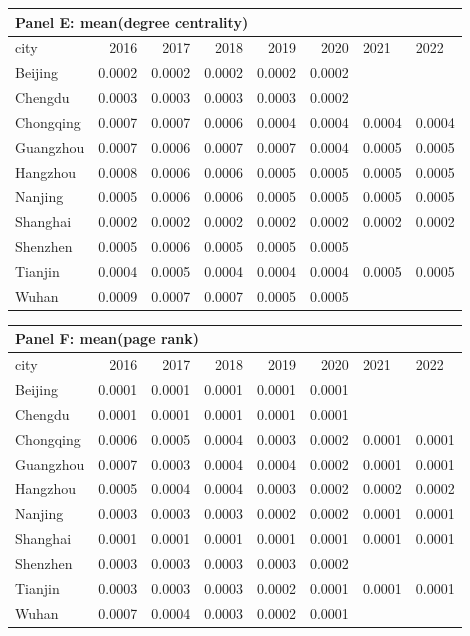 \begin{tabular}{lrrrrrll}
    \multicolumn{8}{l}{\textbf{Panel E: mean(degree centrality)}}\\
\hline
 city      &   2016 &   2017 &   2018 &   2019 &   2020 & 2021   & 2022   \\
\hline
 Beijing   & 0.0002 & 0.0002 & 0.0002 & 0.0002 & 0.0002 &        &        \\
 Chengdu   & 0.0003 & 0.0003 & 0.0003 & 0.0003 & 0.0002 &        &        \\
 Chongqing & 0.0007 & 0.0007 & 0.0006 & 0.0004 & 0.0004 & 0.0004 & 0.0004 \\
 Guangzhou & 0.0007 & 0.0006 & 0.0007 & 0.0007 & 0.0004 & 0.0005 & 0.0005 \\
 Hangzhou  & 0.0008 & 0.0006 & 0.0006 & 0.0005 & 0.0005 & 0.0005 & 0.0005 \\
 Nanjing   & 0.0005 & 0.0006 & 0.0006 & 0.0005 & 0.0005 & 0.0005 & 0.0005 \\
 Shanghai  & 0.0002 & 0.0002 & 0.0002 & 0.0002 & 0.0002 & 0.0002 & 0.0002 \\
 Shenzhen  & 0.0005 & 0.0006 & 0.0005 & 0.0005 & 0.0005 &        &        \\
 Tianjin   & 0.0004 & 0.0005 & 0.0004 & 0.0004 & 0.0004 & 0.0005 & 0.0005 \\
 Wuhan     & 0.0009 & 0.0007 & 0.0007 & 0.0005 & 0.0005 &        &        \\
\hline
\end{tabular}

\begin{tabular}{lrrrrrll}
    \multicolumn{8}{l}{\textbf{Panel F: mean(page rank)}}\\
\hline
 city      &   2016 &   2017 &   2018 &   2019 &   2020 & 2021   & 2022   \\
\hline
 Beijing   & 0.0001 & 0.0001 & 0.0001 & 0.0001 & 0.0001 &        &        \\
 Chengdu   & 0.0001 & 0.0001 & 0.0001 & 0.0001 & 0.0001 &        &        \\
 Chongqing & 0.0006 & 0.0005 & 0.0004 & 0.0003 & 0.0002 & 0.0001 & 0.0001 \\
 Guangzhou & 0.0007 & 0.0003 & 0.0004 & 0.0004 & 0.0002 & 0.0001 & 0.0001 \\
 Hangzhou  & 0.0005 & 0.0004 & 0.0004 & 0.0003 & 0.0002 & 0.0002 & 0.0002 \\
 Nanjing   & 0.0003 & 0.0003 & 0.0003 & 0.0002 & 0.0002 & 0.0001 & 0.0001 \\
 Shanghai  & 0.0001 & 0.0001 & 0.0001 & 0.0001 & 0.0001 & 0.0001 & 0.0001 \\
 Shenzhen  & 0.0003 & 0.0003 & 0.0003 & 0.0003 & 0.0002 &        &        \\
 Tianjin   & 0.0003 & 0.0003 & 0.0003 & 0.0002 & 0.0001 & 0.0001 & 0.0001 \\
 Wuhan     & 0.0007 & 0.0004 & 0.0003 & 0.0002 & 0.0001 &        &        \\
\hline
\end{tabular}

